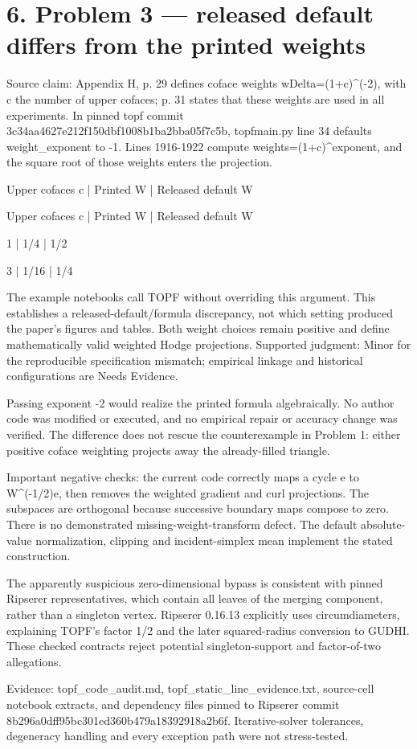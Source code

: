 \documentclass[10pt]{article}
\begin{document}
\section*{6. Problem 3 — released default differs from the printed weights}
Source claim: Appendix H, p. 29 defines coface weights wDelta=(1+c)\textasciicircum{}(-2), with c the number of upper cofaces; p. 31 states that these weights are used in all experiments. In pinned topf commit 3c34aa4627e212f150dbf1008b1ba2bba05f7c5b, topfmain.py line 34 defaults weight\_exponent to -1. Lines 1916-1922 compute weights=(1+c)\textasciicircum{}exponent, and the square root of those weights enters the projection.\par
Upper cofaces c | Printed W | Released default W\par
Upper cofaces c | Printed W | Released default W\par
1 | 1/4 | 1/2\par
3 | 1/16 | 1/4\par
The example notebooks call TOPF without overriding this argument. This establishes a released-default/formula discrepancy, not which setting produced the paper’s figures and tables. Both weight choices remain positive and define mathematically valid weighted Hodge projections. Supported judgment: Minor for the reproducible specification mismatch; empirical linkage and historical configurations are Needs Evidence.\par
Passing exponent -2 would realize the printed formula algebraically. No author code was modified or executed, and no empirical repair or accuracy change was verified. The difference does not rescue the counterexample in Problem 1: either positive coface weighting projects away the already-filled triangle.\par
Important negative checks: the current code correctly maps a cycle e to W\textasciicircum{}(-1/2)e, then removes the weighted gradient and curl projections. The subspaces are orthogonal because successive boundary maps compose to zero. There is no demonstrated missing-weight-transform defect. The default absolute-value normalization, clipping and incident-simplex mean implement the stated construction.\par
The apparently suspicious zero-dimensional bypass is consistent with pinned Ripserer representatives, which contain all leaves of the merging component, rather than a singleton vertex. Ripserer 0.16.13 explicitly uses circumdiameters, explaining TOPF’s factor 1/2 and the later squared-radius conversion to GUDHI. These checked contracts reject potential singleton-support and factor-of-two allegations.\par
Evidence: topf\_code\_audit.md, topf\_static\_line\_evidence.txt, source-cell notebook extracts, and dependency files pinned to Ripserer commit 8b296a0dff95bc301ed360b479a18392918a2b6f. Iterative-solver tolerances, degeneracy handling and every exception path were not stress-tested.\par
\end{document}
